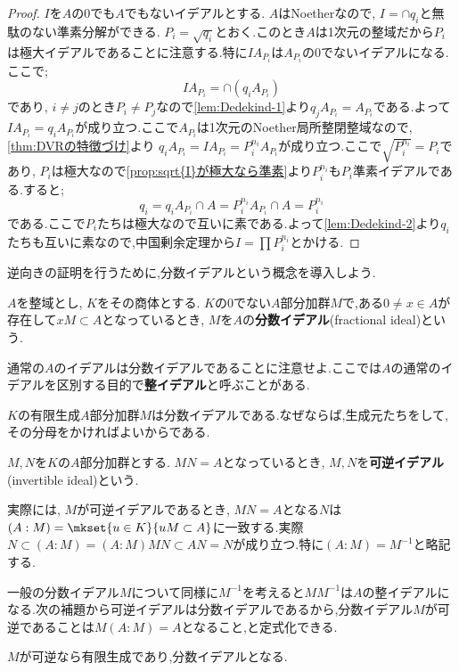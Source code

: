 \begin{proof}
	$I$を$A$の0でも$A$でもないイデアルとする. $A$はNoetherなので, $I=\cap q_i$と無駄のない準素分解ができる. $P_i=\sqrt{q_i}$とおく.このとき$A$は1次元の整域だから$P_i$は極大イデアルであることに注意する.特に$IA_{P_i}$は$A_{P_i}$の0でないイデアルになる.ここで;
	\[IA_{P_i}=\cap (q_iA_{P_i})\]
	であり, $i\neq j$のとき$P_i\neq P_j$なので\ref{lem:Dedekind-1}より$q_jA_{P_i}=A_{P_i}$である.よって$IA_{P_i}=q_iA_{P_i}$が成り立つ.ここで$A_{P_i}$は1次元のNoether局所整閉整域なので, \ref{thm:DVRの特徴づけ}より $q_iA_{P_i}=IA_{P_i}=P_i^{n_i}A_{P_i}$が成り立つ.ここで$\sqrt{P_i^{n_i}}=P_i$であり, $P_i$は極大なので\ref{prop:sqrt{I}が極大なら準素}より$P_i^{n_i}$も$P_i$準素イデアルである.すると;
	\[q_i=q_iA_{P_i}\cap A=P_i^{n_i}A_{P_i}\cap A=P_i^{n_i}\]
	である.ここで$P_i$たちは極大なので互いに素である.よって\ref{lem:Dedekind-2}より$q_i$たちも互いに素なので,中国剰余定理から$I=\prod P_i^{n_i}$とかける.
\end{proof}

逆向きの証明を行うために,分数イデアルという概念を導入しよう.

\begin{defi}[分数イデアル]
	$A$を整域とし, $K$をその商体とする. $K$の0でない$A$部分加群$M$で,ある$0\neq x\in A$が存在して$xM\subset A$となっているとき, $M$を$A$の\textbf{分数イデアル}(fractional ideal)という.
\end{defi}

通常の$A$のイデアルは分数イデアルであることに注意せよ.ここでは$A$の通常のイデアルを区別する目的で\textbf{整イデアル}と呼ぶことがある.

$K$の有限生成$A$部分加群$M$は分数イデアルである.なぜならば,生成元たちをして,その分母をかければよいからである.

\begin{defi}[可逆イデアル]
	$M,N$を$K$の$A$部分加群とする. $MN=A$となっているとき, $M,N$を\textbf{可逆イデアル}(invertible ideal)という.
\end{defi}
	実際には, $M$が可逆イデアルであるとき, $MN=A$となる$N$は$(A:M)=\mkset{u\in K}{uM\subset A}$に一致する.実際$N\subset (A:M)=(A:M)MN\subset AN=N$が成り立つ.特に$(A:M)=M^{-1}$と略記する.
	
	一般の分数イデアル$M$について同様に$M^{-1}$を考えると$MM^{-1}$は$A$の整イデアルになる.次の補題から可逆イデアルは分数イデアルであるから,分数イデアル$M$が可逆であることは$M(A:M)=A$となること,と定式化できる.

\begin{lem}
	$M$が可逆なら有限生成であり,分数イデアルとなる.
\end{lem}

